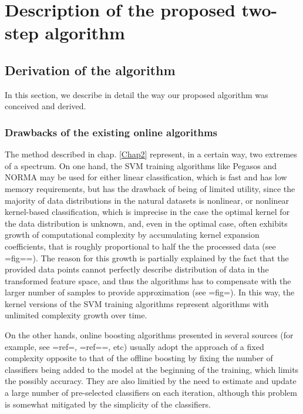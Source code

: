 
\chapter{Description of the proposed two-step algorithm} %
\label{OurMethod}
\section{Derivation of the algorithm}
In this section, we describe in detail the way our proposed algorithm was conceived and derived. 
\subsection{Drawbacks of the existing online algorithms}
The method described in chap. \ref{Chap2} represent, in a certain way, two extremes of a spectrum. On one hand, the SVM training algorithms like Pegasos and NORMA may be used for either linear classification, which is fast and has low memory requirements, but has the drawback of being of limited utility, since the majority of data distributions in the natural datasets is nonlinear, or nonlinear kernel-based classification, which is imprecise in the case the optimal kernel for the data distribution is unknown, and, even in the optimal case, often exhibits growth of computational complexity by accumulating kernel expansion coefficients, that is roughly proportional to half the the processed data (see {{=fig==}}). The reason for this growth is partially explained by the fact that the provided data points cannot perfectly describe distribution of data in the transformed feature space, and thus the algorithms has to compensate with the larger number of samples to provide approximation (see {{=fig=}}). In this way, the kernel versions of the SVM training algorithms represent algorithms with unlimited complexity growth over time.

On the other hands, online boosting algorithms presented in several sources (for example, see {{=ref=}}, {{=ref==}}, etc) usually adopt the approach of a fixed complexity opposite to that of the offline boosting by fixing the number of classifiers being added to the model at the beginning of the training, which limits the possibly accuracy. They are also limitied by the need to estimate and update a large number of pre-selected classifiers on each iteration, although this problem is somewhat mitigated by the simplicity of the classifiers.

